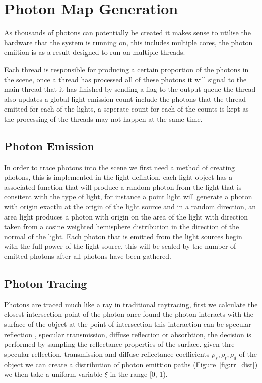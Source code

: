 \section{Photon Map Generation}
As thousands of photons can potentially be created it makes sense to utilise the hardware that the system is running on, this
includes multiple cores, the photon emiition is as a result designed to run on multiple threads.

Each thread is responsible for producing a certain proportion of the photons in the scene, once a thread has processed all
of these photons it will signal to the main thread that it has finished by sending a flag to the output queue the thread also
updates a global light emission count include the photons that the thread emitted for each of the lights, a seperate count for
each of the counts is kept as the processing of the threads may not happen at the same time.

\subsection{Photon Emission}
In order to trace photons into the scene we first need a method of creating photons, this is implemented in the light 
defintion, each light object has a associated function that will produce a random photon from the light that is consitent with 
the type of light, for instance a point light will generate a photon with origin exactlu at the origin of the light source and
in a random direction, an area light produces a photon with origin on the area of the light with direction taken from a
cosine weighted hemisphere distribution in the direction of the normal of the light. Each photon that is emitted from the
light sources begin with the full power of the light source, this will be scaled by the number of emitted photons after
all photons have been gathered.

\subsection{Photon Tracing}
Photons are traced much like a ray in traditional raytracing, first we calculate the closest intersection point of the photon
once found the photon interacts with the surface of the object at the point of intersection this interaction can be specular 
reflection , specular transmission, diffuse reflection or absorbtion, the decision is performed by sampling the reflectance
properties of the surface. given thre specular reflection, transmission and diffuse reflectance coefficients
$\rho_{s}, \rho_{t}, \rho_{d}$ of the object we can create a distribution of photon emittion paths (Figure~\ref{fig:rr_dist}) 
we then take a uniform variable $\xi$ in the range [0, 1).

